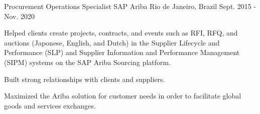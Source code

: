 


\begin{cventries}


\cventry
{Procurement Operations Specialist} %
{SAP Ariba} %
{Rio de Janeiro, Brazil} %
{Sept. 2015 - Nov. 2020} %
{ %
\begin{cvitems}
\item {Helped clients create projects, contracts, and events such as RFI, RFQ, and auctions (Japonese, English, and Dutch)
in the Supplier Lifecycle and Performance (SLP) and Supplier Information and Performance Management (SIPM)
systems on the SAP Ariba Sourcing platform.}
\item {Built strong relationships with clients and suppliers.}
\item {Maximized the Ariba solution for customer needs in order to facilitate global goods and services exchanges.}
\end{cvitems}
}



\end{cventries}
